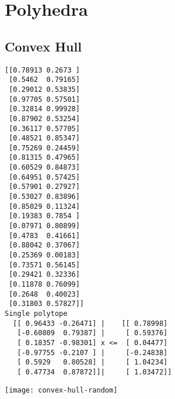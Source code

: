 
\section{Polyhedra}

\subsection{Convex Hull}

\begin{verbatim}
[[0.78913 0.2673 ]
 [0.5462  0.79165]
 [0.29012 0.53835]
 [0.97705 0.57501]
 [0.32814 0.99928]
 [0.87902 0.53254]
 [0.36117 0.57705]
 [0.48521 0.85347]
 [0.75269 0.24459]
 [0.81315 0.47965]
 [0.60529 0.84873]
 [0.64951 0.57425]
 [0.57901 0.27927]
 [0.53027 0.83896]
 [0.85029 0.11324]
 [0.19383 0.7854 ]
 [0.07971 0.80899]
 [0.4783  0.41661]
 [0.88042 0.37067]
 [0.25369 0.00183]
 [0.73571 0.56145]
 [0.29421 0.32336]
 [0.11878 0.76099]
 [0.2648  0.40023]
 [0.31803 0.57827]]
Single polytope 
  [[ 0.96433 -0.26471] |    [[ 0.78998]
   [-0.60809  0.79387] |     [ 0.59376]
   [ 0.18357 -0.98301] x <=  [ 0.04477]
   [-0.97755 -0.2107 ] |     [-0.24838]
   [ 0.5929   0.80528] |     [ 1.04234]
   [ 0.47734  0.87872]]|     [ 1.03472]]
\end{verbatim}

\texttt{[image: convex-hull-random]}


